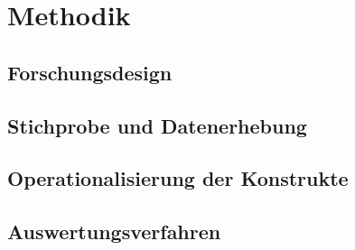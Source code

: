 \chapter{Methodik}\label{chap:methodik}



\section{Forschungsdesign}\label{sec:design}

\section{Stichprobe und Datenerhebung}\label{sec:stichprobe}
\tabStichprobe

\section{Operationalisierung der Konstrukte}\label{sec:operationalisierung}

\section{Auswertungsverfahren}\label{sec:verfahren}
